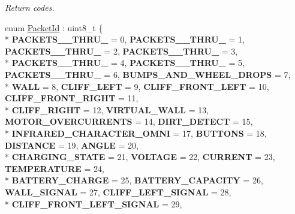 \begin{DoxyCompactItemize}
\begin{DoxyCompactList}\small\item\em Return codes. \end{DoxyCompactList}\item 
\hypertarget{namespaceroomba_1_1series500_1_1oi_1_1sensors_a909f47d40452d1cabb85eef642ac04b6}{enum \hyperlink{namespaceroomba_1_1series500_1_1oi_1_1sensors_a909f47d40452d1cabb85eef642ac04b6}{Packet\+Id} \+: uint8\+\_\+t \{ \\*
{\bfseries P\+A\+C\+K\+E\+T\+S\+\_\+\_\+\+T\+H\+R\+U\+\_} = 0, 
{\bfseries P\+A\+C\+K\+E\+T\+S\+\_\+\_\+\+T\+H\+R\+U\+\_} = 1, 
{\bfseries P\+A\+C\+K\+E\+T\+S\+\_\+\_\+\+T\+H\+R\+U\+\_} = 2, 
{\bfseries P\+A\+C\+K\+E\+T\+S\+\_\+\_\+\+T\+H\+R\+U\+\_} = 3, 
\\*
{\bfseries P\+A\+C\+K\+E\+T\+S\+\_\+\_\+\+T\+H\+R\+U\+\_} = 4, 
{\bfseries P\+A\+C\+K\+E\+T\+S\+\_\+\_\+\+T\+H\+R\+U\+\_} = 5, 
{\bfseries P\+A\+C\+K\+E\+T\+S\+\_\+\_\+\+T\+H\+R\+U\+\_} = 6, 
{\bfseries B\+U\+M\+P\+S\+\_\+\+A\+N\+D\+\_\+\+W\+H\+E\+E\+L\+\_\+\+D\+R\+O\+P\+S} = 7, 
\\*
{\bfseries W\+A\+L\+L} = 8, 
{\bfseries C\+L\+I\+F\+F\+\_\+\+L\+E\+F\+T} = 9, 
{\bfseries C\+L\+I\+F\+F\+\_\+\+F\+R\+O\+N\+T\+\_\+\+L\+E\+F\+T} = 10, 
{\bfseries C\+L\+I\+F\+F\+\_\+\+F\+R\+O\+N\+T\+\_\+\+R\+I\+G\+H\+T} = 11, 
\\*
{\bfseries C\+L\+I\+F\+F\+\_\+\+R\+I\+G\+H\+T} = 12, 
{\bfseries V\+I\+R\+T\+U\+A\+L\+\_\+\+W\+A\+L\+L} = 13, 
{\bfseries M\+O\+T\+O\+R\+\_\+\+O\+V\+E\+R\+C\+U\+R\+R\+E\+N\+T\+S} = 14, 
{\bfseries D\+I\+R\+T\+\_\+\+D\+E\+T\+E\+C\+T} = 15, 
\\*
{\bfseries I\+N\+F\+R\+A\+R\+E\+D\+\_\+\+C\+H\+A\+R\+A\+C\+T\+E\+R\+\_\+\+O\+M\+N\+I} = 17, 
{\bfseries B\+U\+T\+T\+O\+N\+S} = 18, 
{\bfseries D\+I\+S\+T\+A\+N\+C\+E} = 19, 
{\bfseries A\+N\+G\+L\+E} = 20, 
\\*
{\bfseries C\+H\+A\+R\+G\+I\+N\+G\+\_\+\+S\+T\+A\+T\+E} = 21, 
{\bfseries V\+O\+L\+T\+A\+G\+E} = 22, 
{\bfseries C\+U\+R\+R\+E\+N\+T} = 23, 
{\bfseries T\+E\+M\+P\+E\+R\+A\+T\+U\+R\+E} = 24, 
\\*
{\bfseries B\+A\+T\+T\+E\+R\+Y\+\_\+\+C\+H\+A\+R\+G\+E} = 25, 
{\bfseries B\+A\+T\+T\+E\+R\+Y\+\_\+\+C\+A\+P\+A\+C\+I\+T\+Y} = 26, 
{\bfseries W\+A\+L\+L\+\_\+\+S\+I\+G\+N\+A\+L} = 27, 
{\bfseries C\+L\+I\+F\+F\+\_\+\+L\+E\+F\+T\+\_\+\+S\+I\+G\+N\+A\+L} = 28, 
\\*
{\bfseries C\+L\+I\+F\+F\+\_\+\+F\+R\+O\+N\+T\+\_\+\+L\+E\+F\+T\+\_\+\+S\+I\+G\+N\+A\+L} = 29, 
}
\end{DoxyCompactItemize}
